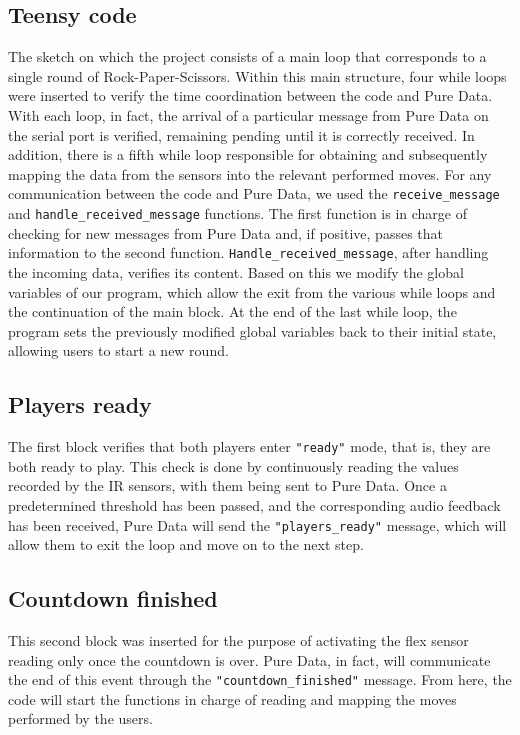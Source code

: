 \documentclass[11pt,a4paper]{report}
\begin{document}
\subsection*{Teensy code}
The sketch on which the project consists of a main loop that corresponds to a single round of Rock-Paper-Scissors.
Within this main structure, four while loops were inserted to verify the time coordination between the code and Pure Data. With each loop, in fact, the arrival of a particular message from Pure Data on the serial port is verified, remaining pending until it is correctly received. In addition, there is a fifth while loop responsible for obtaining and subsequently mapping the data from the sensors into the relevant performed moves.
For any communication between the code and Pure Data, we used the \texttt{receive\_message} and \texttt{handle\_received\_message} functions. The first function is in charge of checking for new messages from Pure Data and, if positive, passes that information to the second function.
\texttt{Handle\_received\_message}, after handling the incoming data, verifies its content. Based on this we modify the global variables of our program, which allow the exit from the various while loops and the continuation of the main block.
At the end of the last while loop, the program sets the previously modified global variables back to their initial state, allowing users to start a new round.
\subsection*{Players ready}
The first block verifies that both players enter \texttt{"ready"} mode, that is, they are both ready to play. This check is done by continuously reading the values recorded by the IR sensors, with them being sent to Pure Data. Once a predetermined threshold has been passed, and the corresponding audio feedback has been received, Pure Data will send the \texttt{"players\_ready"} message, which will allow them to exit the loop and move on to the next step.
\subsection*{Countdown finished}
This second block was inserted for the purpose of activating the flex sensor reading only once the countdown is over. Pure Data, in fact, will communicate the end of this event through the \texttt{"countdown\_finished"} message. From here, the code will start the functions in charge of reading and mapping the moves performed by the users.
\end{document}
